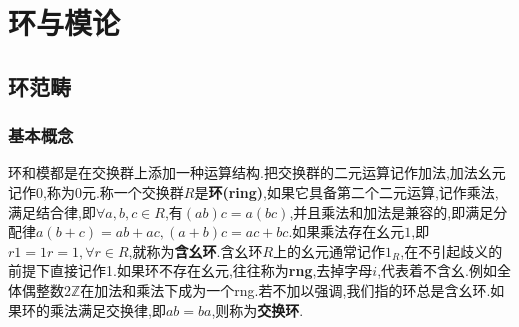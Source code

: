 \chapter{环与模论}
\section{环范畴}
\subsection{基本概念}

环和模都是在交换群上添加一种运算结构.把交换群的二元运算记作加法,加法幺元记作0,称为0元.称一个交换群$R$是\textbf{环(ring)},如果它具备第二个二元运算,记作乘法,满足结合律,即$\forall a,b,c\in R$,有$(ab)c=a(bc)$,并且乘法和加法是兼容的,即满足分配律$a(b+c)=ab+ac,(a+b)c=ac+bc$.如果乘法存在幺元$1$,即$r1=1r=1,\forall r\in R$,就称为\textbf{含幺环}.含幺环$R$上的幺元通常记作$1_R$,在不引起歧义的前提下直接记作1.如果环不存在幺元,往往称为\textbf{rng},去掉字母$i$,代表着不含幺.例如全体偶整数$2\mathbb{Z}$在加法和乘法下成为一个rng.若不加以强调,我们指的环总是含幺环.如果环的乘法满足交换律,即$ab=ba$,则称为\textbf{交换环}.
